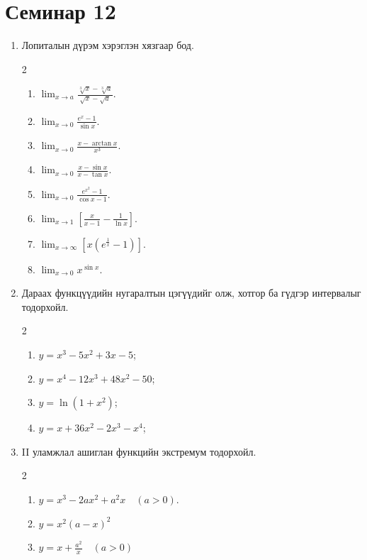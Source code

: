 \section{Семинар 12}
\begin{enumerate}
  \item Лопиталын дүрэм хэрэглэн хязгаар бод.
  \begin{multicols}{2}
\begin{enumerate}
  \item $\displaystyle\lim_{x\to a} \frac{\sqrt[3]{x}-\sqrt[3]{a}}{\sqrt{x}-\sqrt{a}}.$
 \item $ \displaystyle\lim_{x\to 0} \frac{e^{x}-1}{\sin x}.$
 \item $\displaystyle\lim_{x\to 0} \frac{x-\arctan x}{x^{3}}.$
 \item $\displaystyle \lim_{x\to 0} \frac{x-\sin x}{x-\tan x}.$ 
 \item $\displaystyle\lim_{x\to 0}  \frac{e^{x^{2}}-1}{\cos x - 1}.$
 \item $\displaystyle\lim_{x\to 1} 
     \left[\frac{x}{x-1}-\frac{1}{\ln x}\right].$
 \item $\displaystyle  \lim_{x\to \infty} 
     \left[x\left(e^{\frac{1}{x}}-1\right)\right].$
  \item $\displaystyle  \lim_{x\to 0} x^{\sin x}.$
 \end{enumerate} 
 \end{multicols}
 \item Дараах функцүүдийн нугаралтын
цэгүүдийг олж, хотгор ба гүдгэр
интервалыг тодорхойл.
\begin{multicols}{2}
 \begin{enumerate}
   \item $y = x^{3} - 5x^{2} + 3x - 5$;
  \item $y = x^{4} - 12x^{3} + 48x^{2} - 50$;
  \item $y = \ln(1+x^{2})$;
  \item $y = x + 36x^{2} - 2x^{3} - x^{4}$;
 \end{enumerate}
 \end{multicols}
\item II уламжлал ашиглан функцийн
экстремум тодорхойл.
\begin{multicols}{2}
\begin{enumerate}
   \item $y = x^3 - 2ax^2 + a^2x\quad (a>0)$.

\item $y = x^2(a - x)^2$

\item $y = x + \frac{a^2}{x}\quad (a>0)$


\end{enumerate}
\end{multicols}
\end{enumerate}
